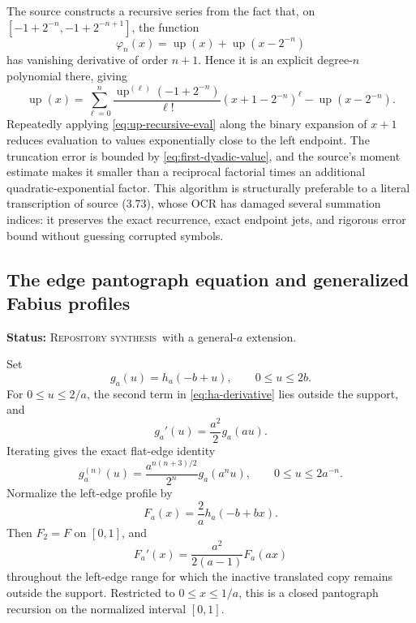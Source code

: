 \documentclass[11pt]{article}
\theoremstyle{definition}
\theoremstyle{remark}
\newcommand{\Up}{\operatorname{up}}
\newcommand{\RepoStatus}{\textcolor{RepoOlive}{\textsc{Repository synthesis}}}
\newcommand{\status}[1]{\par\smallskip\noindent\textbf{Status:} #1.\par\smallskip}
\begin{document}
The source constructs a recursive series from the fact that, on
\([-1+2^{-n},-1+2^{-n+1}]\), the function
\begin{equation}
  \varphi_n(x)=\Up(x)+\Up(x-2^{-n})
  \label{eq:phi-n}
\end{equation}
has vanishing derivative of order \(n+1\).  Hence it is an explicit degree-\(n\) polynomial there, giving
\begin{equation}
  \Up(x)=\sum_{\ell=0}^{n}
   \frac{\Up^{(\ell)}(-1+2^{-n})}{\ell!}
   (x+1-2^{-n})^\ell-\Up(x-2^{-n}).
  \label{eq:up-recursive-eval}
\end{equation}
Repeatedly applying \eqref{eq:up-recursive-eval} along the binary expansion of \(x+1\) reduces evaluation to values exponentially close to the left endpoint.  The truncation error is bounded by \eqref{eq:first-dyadic-value}, and the source's moment estimate makes it smaller than a reciprocal factorial times an additional quadratic-exponential factor.  This algorithm is structurally preferable to a literal transcription of source (3.73), whose OCR has damaged several summation indices: it preserves the exact recurrence, exact endpoint jets, and rigorous error bound without guessing corrupted symbols.

\subsection{The edge pantograph equation and generalized Fabius profiles}
\status{\RepoStatus\ with a general-\(a\) extension}

Set
\begin{equation}
  g_a(u)=h_a(-b+u),
  \qquad 0\le u\le2b.
  \label{eq:ga-edge}
\end{equation}
For \(0\le u\le2/a\), the second term in \eqref{eq:ha-derivative} lies outside the support, and
\begin{equation}
  g_a'(u)=\frac{a^2}{2}g_a(au).
  \label{eq:ga-pantograph}
\end{equation}
Iterating gives the exact flat-edge identity
\begin{equation}
  g_a^{(n)}(u)=\frac{a^{n(n+3)/2}}{2^n}g_a(a^n u),
  \qquad 0\le u\le2a^{-n}.
  \label{eq:ga-iterated}
\end{equation}
Normalize the left-edge profile by
\begin{equation}
  F_a(x)=\frac2a h_a(-b+bx).
  \label{eq:Fa-general}
\end{equation}
Then \(F_2=F\) on \([0,1]\), and
\begin{equation}
  F_a'(x)=\frac{a^2}{2(a-1)}F_a(ax)
  \label{eq:Fa-pantograph}
\end{equation}
throughout the left-edge range for which the inactive translated copy remains outside the support.  Restricted to \(0\le x\le1/a\), this is a closed pantograph recursion on the normalized interval \([0,1]\).
\end{document}
